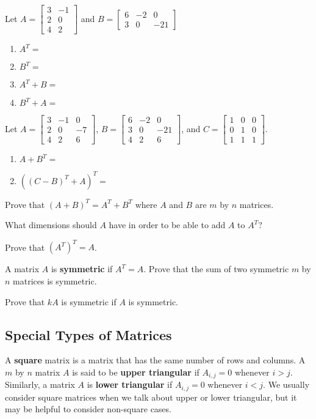 \bq Let $A=\begin{bmatrix} 3&-1 \\2&0 \\ 4&2 \end{bmatrix}$ and $B=\begin{bmatrix} 6&-2&0 \\3&0&-21 \end{bmatrix}$
\begin{enumerate}
\item $A^T=$
\item $B^T=$
\item $A^T+B=$
\item $B^T+A=$
\end{enumerate}
\eq

\bq Let $A=\begin{bmatrix} 3&-1&0 \\2&0&-7 \\ 4&2&6 \end{bmatrix}$, $B=\begin{bmatrix} 6&-2&0 \\3&0&-21 \\ 4&2&6 \end{bmatrix}$, \break and $C=\begin{bmatrix} 1&0&0 \\0&1&0\\1&1&1 \end{bmatrix}$.
\begin{enumerate}
\item $A+B^T=$
\item $((C-B)^T+A)^T=$
\end{enumerate}
\eq

\bq Prove that $(A+B)^T=A^T+B^T$ where $A$ and $B$ are $m$ by $n$ matrices.
\eq

\bq What dimensions should $A$ have in order to be able to add $A$ to $A^T$?
\eq

\bq Prove that $(A^T)^T=A$.
\eq

A matrix $A$ is \textbf{symmetric} if $A^T=A$.
\bq Prove that the sum of two symmetric $m$ by $n$ matrices is symmetric.
\eq

\bq Prove that $kA$ is symmetric if $A$ is symmetric. \eq


\subsection{Special Types of Matrices}
A \textbf{square} matrix is a matrix that has the same number of rows and columns. A $m$ by $n$ matrix $A$ is said to be \textbf{upper triangular} if $A_{i,j}=0$ whenever $i>j$. Similarly, a matrix $A$ is \textbf{lower triangular} if $A_{i,j}=0$ whenever $i<j$. We usually consider square matrices when we talk about upper or lower triangular, but it may be helpful to consider non-square cases. %

